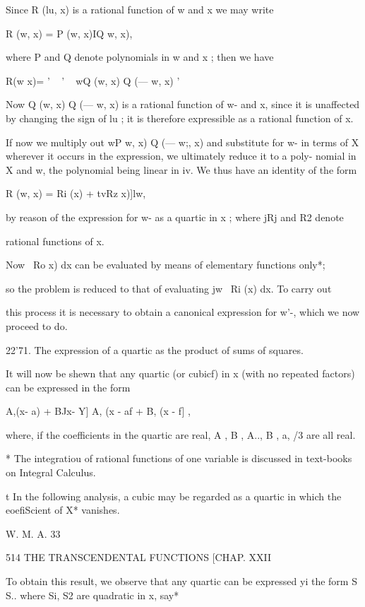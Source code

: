 Since R (lu, x) is a rational function of w and x we may write

R (w, x) = P (w, x)IQ w, x),

where P and Q denote polynomials in w and x ; then we have

R(w x)= ' ~ ' ~ wQ (w, x) Q (— w, x) '

Now Q (w, x) Q (— w, x) is a rational function of w- and x, since it
is unaffected by changing the sign of lu ; it is therefore expressible
as a rational function of x.

If now we multiply out wP w, x) Q (— w;, x) and substitute for w- in
terms of X wherever it occurs in the expression, we ultimately reduce
it to a poly- nomial in X and w, the polynomial being linear in iv. We
thus have an identity of the form

R (w, x) = Ri (x) + tvRz x)]lw,

by reason of the expression for w- as a quartic in x ; where jRj and
R2 denote

rational functions of x.



Now \ Ro x) dx can be evaluated by means of elementary functions
only*;

so the problem is reduced to that of evaluating jw~ Ri (x) dx. To
carry out

this process it is necessary to obtain a canonical expression for w'-,
which we now proceed to do.

22'71. The expression of a quartic as the product of sums of squares.

It will now be shewn that any quartic (or cubicf) in x (with no
repeated factors) can be expressed in the form

 A,(x- a) + BJx- Y] A, (x - af + B, (x - f] ,

where, if the coefficients in the quartic are real, A , B , A.., B ,
a, /3 are all real.

* The integratiou of rational functions of one variable is discussed
in text-books on Integral Calculus.

t In the following analysis, a cubic may be regarded as a quartic in
which the eoefiScient of X* vanishes.

W. M. A. 33



514 THE TRANSCENDENTAL FUNCTIONS [CHAP. XXII

To obtain this result, we observe that any quartic can be expressed yi
the form S S.. where Si, S2 are quadratic in x, say*

